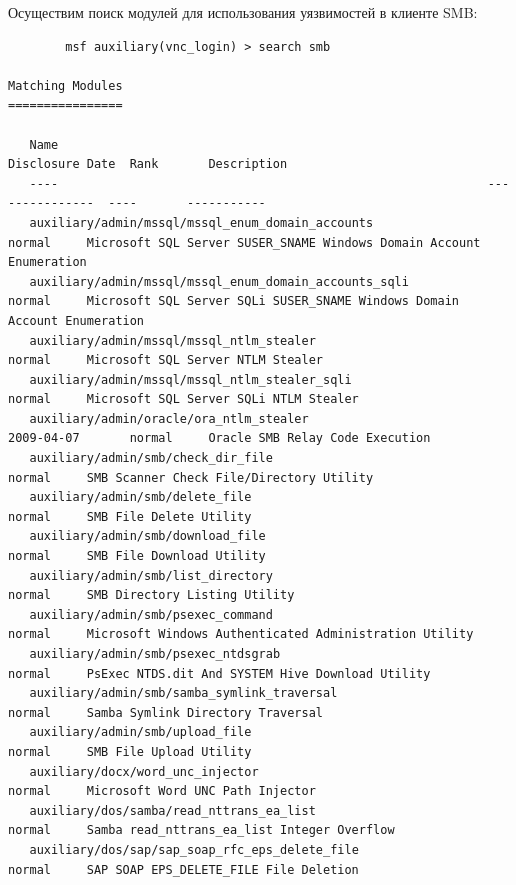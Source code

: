 \documentclass[10pt,a4paper]{report}
\begin{document}
		Осуществим поиск модулей для использования уязвимостей в клиенте SMB:
		\begin{lstlisting}
		msf auxiliary(vnc_login) > search smb

Matching Modules
================

   Name                                                            Disclosure Date  Rank       Description
   ----                                                            ---------------  ----       -----------
   auxiliary/admin/mssql/mssql_enum_domain_accounts                                 normal     Microsoft SQL Server SUSER_SNAME Windows Domain Account Enumeration
   auxiliary/admin/mssql/mssql_enum_domain_accounts_sqli                            normal     Microsoft SQL Server SQLi SUSER_SNAME Windows Domain Account Enumeration
   auxiliary/admin/mssql/mssql_ntlm_stealer                                         normal     Microsoft SQL Server NTLM Stealer
   auxiliary/admin/mssql/mssql_ntlm_stealer_sqli                                    normal     Microsoft SQL Server SQLi NTLM Stealer
   auxiliary/admin/oracle/ora_ntlm_stealer                         2009-04-07       normal     Oracle SMB Relay Code Execution
   auxiliary/admin/smb/check_dir_file                                               normal     SMB Scanner Check File/Directory Utility
   auxiliary/admin/smb/delete_file                                                  normal     SMB File Delete Utility
   auxiliary/admin/smb/download_file                                                normal     SMB File Download Utility
   auxiliary/admin/smb/list_directory                                               normal     SMB Directory Listing Utility
   auxiliary/admin/smb/psexec_command                                               normal     Microsoft Windows Authenticated Administration Utility
   auxiliary/admin/smb/psexec_ntdsgrab                                              normal     PsExec NTDS.dit And SYSTEM Hive Download Utility
   auxiliary/admin/smb/samba_symlink_traversal                                      normal     Samba Symlink Directory Traversal
   auxiliary/admin/smb/upload_file                                                  normal     SMB File Upload Utility
   auxiliary/docx/word_unc_injector                                                 normal     Microsoft Word UNC Path Injector
   auxiliary/dos/samba/read_nttrans_ea_list                                         normal     Samba read_nttrans_ea_list Integer Overflow
   auxiliary/dos/sap/sap_soap_rfc_eps_delete_file                                   normal     SAP SOAP EPS_DELETE_FILE File Deletion

\end{lstlisting}
\end{document}
